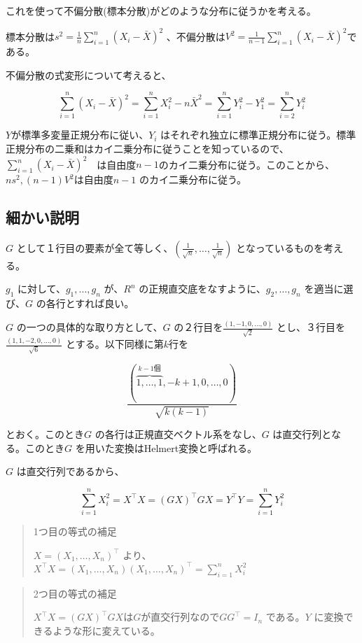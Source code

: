 \documentclass[
  letterpaper,
  DIV=11,
  numbers=noendperiod]{scrartcl}
\theoremstyle{plain}
\theoremstyle{remark}
\begin{document}
これを使って不偏分散(標本分散)がどのような分布に従うかを考える。

標本分散は\(s^2 = \frac{1}{n}\sum_{i=1}^n (X_i-\bar{X})^2\)
、不偏分散は\(V^2 =\frac{1}{n-1}\sum_{i=1}^n (X_i-\bar{X})^2\)である。

不偏分散の式変形について考えると、

\[
\sum_{i=1}^n (X_i-\bar{X})^2 = \sum_{i=1}^n X_i^2-n\bar{X}^2=\sum_{i=1}^n Y_i^2-Y_1^2=\sum_{i=2}^n Y_i^2
\]

\(Y\)が標準多変量正規分布に従い、\(Y_i\)
はそれぞれ独立に標準正規分布に従う。標準正規分布の二乗和はカイ二乗分布に従うことを知っているので、\(\sum_{i=1}^n (X_i-\bar{X})^2\)　は自由度\(n-1\)のカイ二乗分布に従う。このことから、\(ns^2,(n-1)V^2\)は自由度\(n-1\)
のカイ二乗分布に従う。

\subsection{細かい説明}\label{ux7d30ux304bux3044ux8aacux660e}

\(G\)
として１行目の要素が全て等しく、\((\frac{1}{\sqrt{n}}, \dots,\frac{1}{\sqrt{n}})\)
となっているものを考える。

\(g_1\) に対して、\(g_1, \dots,g_n\) が、\(R^n\)
の正規直交底をなすように、\(g_2, \dots,g_n\) を適当に選び、\(G\)
の各行とすれば良い。

\(G\) の一つの具体的な取り方として、\(G\)
の２行目を\(\frac{(1,-1,0, \dots,0)}{\sqrt{2}}\)
とし、３行目を\(\frac{(1,1,-2,0, \dots,0)}{\sqrt{6}}\)
とする。以下同様に第\(k\)行を

\[
\frac{\left( \overbrace{1, \dots, 1}^{k-1 \text{個}}, -k + 1, 0, \dots, 0 \right)}{\sqrt{k(k-1)}}
\]

とおく。このとき\(G\) の各行は正規直交ベクトル系をなし、\(G\)
は直交行列となる。このとき\(G\) を用いた変換はHelmert変換と呼ばれる。

\(G\) は直交行列であるから、

\[
\sum_{i=1}^n X_i^2 = X^{\top}X=(GX)^{\top}GX = Y^{\top} Y = \sum_{i=1}^n Y_i^2
\]

\begin{quote}
1つ目の等式の補足

\(X = (X_1, \dots,X_n)^{\top}\)
より、\(X^{\top}X = (X_1, \dots,X_n)(X_1, \dots,X_n)^{\top}=\sum_{i=1}^n X_i^2\)
\end{quote}

\begin{quote}
2つ目の等式の補足

\(X^{\top}X=(GX)^{\top}GX\)は\(G\)が直交行列なので\(GG^{\top}=I_n\)
である。\(Y\) に変換できるような形に変えている。
\end{quote}
\end{document}
